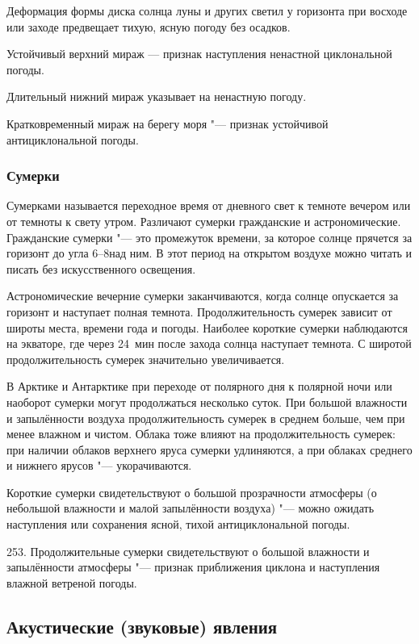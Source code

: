  Деформация формы диска солнца луны и других светил у горизонта
при восходе или заходе предвещает тихую, ясную погоду без осадков.

 Устойчивый верхний мираж — признак наступления ненастной
циклональной погоды.

 Длительный нижний мираж указывает на ненастную погоду.

 Кратковременный мираж на берегу моря "--- признак устойчивой
антициклональной погоды.

\subsubsection{Сумерки}

Сумерками называется переходное время от дневного свет к темноте
вечером или от темноты к свету утром. Различают сумерки гражданские и
астрономические. Гражданские сумерки "--- это промежуток времени, за
которое солнце прячется за горизонт до угла 6--8\gr над ним. В этот
период на открытом воздухе можно читать и писать без искусственного
освещения.

Астрономические вечерние сумерки заканчиваются, когда солнце
опускается за горизонт и наступает полная темнота. Продолжительность
сумерек зависит от широты места, времени года и погоды. Наиболее
короткие сумерки наблюдаются на экваторе, где через 24~мин после
захода солнца наступает темнота. С широтой продолжительность сумерек
значительно увеличивается.

В Арктике и Антарктике при переходе от полярного дня к полярной ночи
или наоборот сумерки могут продолжаться несколько суток. При большой
влажности и запылённости воздуха продолжительность сумерек в среднем
больше, чем при менее влажном и чистом. Облака тоже влияют на
продолжительность сумерек: при наличии облаков верхнего яруса сумерки
удлиняются, а при облаках среднего и нижнего ярусов "--- укорачиваются.

 Короткие сумерки свидетельствуют о большой прозрачности
атмосферы (о небольшой влажности и малой запылённости воздуха) "--- можно
ожидать наступления или сохранения ясной, тихой антициклональной
погоды.

253. Продолжительные сумерки свидетельствуют о большой влажности и
запылённости атмосферы "--- признак приближения циклона и наступления
влажной ветреной погоды.

\subsection{Акустические (звуковые) явления}

